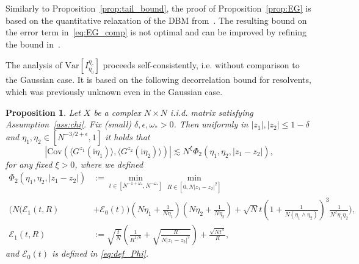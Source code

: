 \documentclass[10pt]{amsart}
\newtheorem{proposition}[theorem]{Proposition}
\numberwithin{equation}{section}
\newcommand{\Cov}{\mathrm{Cov}}
\newcommand{\Var}{\mathrm{Var}}
\newcommand{\ii}{\mathrm{i}}
\begin{document}
Similarly to Proposition~\ref{prop:tail_bound}, the proof of Proposition~\ref{prop:EG} is based on the quantitative relaxation of the DBM from~\cite[Proposition~4.6]{bourgade2024fluctuations}. The resulting bound on the error term in~\eqref{eq:EG_comp} is not optimal and can be improved by refining the bound in~\cite[Proposition~4.6]{bourgade2024fluctuations}.


The analysis of $\Var[I_{\eta_0}^{\eta_c}]$ proceeds self-consistently, i.e. without comparison to the Gaussian case. It is based on the following decorrelation bound for resolvents, which was previously unknown even in the Gaussian case.

\begin{proposition}\label{prop:EGG} Let $X$ be a complex $N\times N$ i.i.d. matrix satisfying Assumption~\ref{ass:chi}. Fix (small) $\delta,\epsilon, \omega_*>0$. Then uniformly in $|z_1|, |z_2|\le 1-\delta$ and $\eta_1,\eta_2\in[ N^{-3/2+\epsilon},1]$ it holds that
\begin{equation}
\left\vert\Cov\left( \langle G^{z_1}(\ii\eta_1)\rangle, \langle G^{z_2}(\ii\eta_2)\rangle\right)\right\vert \lesssim N^\xi \Phi_2(\eta_1,\eta_2, |z_1-z_2|),
\label{eq:EGG}
\end{equation}
for any fixed $\xi>0$, where we defined
\begin{equation}
\begin{split}
\Phi_2(\eta_1,\eta_2,|z_1-z_2|)&:=\min_{t\in [N^{-1+\omega_*}, N^{-\omega_*}]} \min_{R\in [0,N|z_1-z_2|^2]} \\
\Bigg(N(\mathcal{E}_1(t,R)&+\mathcal{E}_0(t))\left(N\eta_1+\frac{1}{N\eta_1}\right)\left(N\eta_2+\frac{1}{N\eta_2}\right) + \sqrt{N}t \left(1+\frac{1}{N(\eta_1\wedge\eta_2)}\right)^3\frac{1}{N^2\eta_1\eta_2}\Bigg),\\ 
\mathcal{E}_1(t,R)&:=\sqrt{\frac{t}{N}}\left(\frac{1}{R^{1/8}}+\sqrt{\frac{R}{N|z_1-z_2|^2}}\right)+\frac{\sqrt{Nt^3}}{R},
\end{split}
\label{eq:def_Phi2}
\end{equation}
and $\mathcal{E}_0(t)$ is defined in \eqref{eq:def_Phi}.
\end{proposition}
\end{document}
